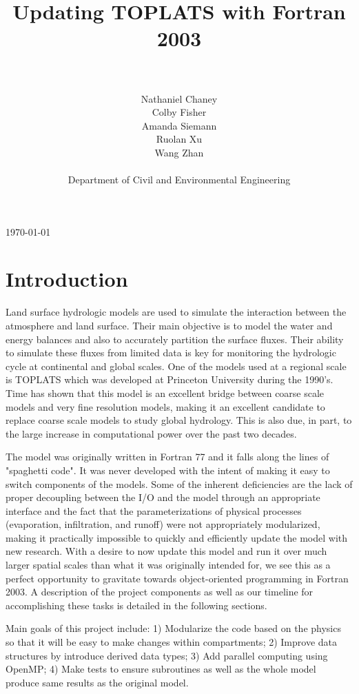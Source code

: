 \documentclass[pdftex,12pt,a4paper]{article}
\title{Updating TOPLATS with Fortran 2003}
\author{\\ \\ Nathaniel Chaney\\ Colby Fisher\\ Amanda Siemann\\ Ruolan Xu\\ Wang Zhan \\ \\ Department of Civil and Environmental Engineering}
\date{}
\begin{document}
\maketitle
\vfill
\begin{center}
{\large \today}
\end{center}

\newpage

\section{Introduction}
Land surface hydrologic models are used to simulate the interaction between the atmosphere and land surface. Their main objective is to model the water and energy balances and also to accurately partition the surface fluxes. Their ability to simulate these fluxes from limited data is key for monitoring the hydrologic cycle at continental and global scales. One of the models used at a regional scale is TOPLATS which was developed at Princeton University during the 1990's. Time has shown that this model is an excellent bridge between coarse scale models and very fine resolution models, making it an excellent candidate to replace coarse scale models to study global hydrology. This is also due, in part, to the large increase in computational power over the past two decades. 

The model was originally written in Fortran 77 and it falls along the lines of "spaghetti code". It was never developed with the intent of making it easy to switch components of the models. Some of the inherent deficiencies are the lack of proper decoupling between the I/O and the model through an appropriate interface and the fact that the parameterizations of physical processes (evaporation, infiltration, and runoff) were not appropriately modularized, making it practically impossible to quickly and efficiently update the model with new research. With a desire to now update this model and run it over much larger spatial scales than what it was originally intended for, we see this as a perfect opportunity to gravitate towards object-oriented programming in Fortran 2003. A description of the project components as well as our timeline for accomplishing these tasks is detailed in the following sections.

Main goals of this project include: 1) Modularize the code based on the physics so that it will be easy to make changes within compartments; 2) Improve data structures by introduce derived data types; 3) Add parallel computing using OpenMP; 4) Make tests to ensure subroutines as well as the whole model produce same results as the original model. 
\end{document}
